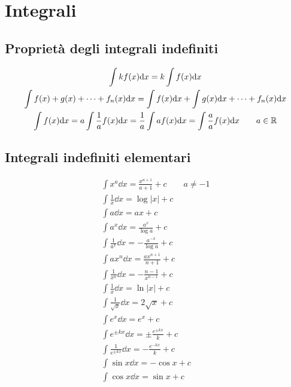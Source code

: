 
\chapter{Integrali} %

\label{ch:integrali} %

\section{Proprietà degli integrali indefiniti}
\begin{gather}
\int kf(x)\mathrm{d} x=k\int f(x)\mathrm{d} x\\
\int f(x)+g(x)+\dots+f_n(x)\mathrm{d} x=\int f(x)\mathrm{d} x+\int g(x)\mathrm{d} x+\dots+f_n(x)\mathrm{d} x \\
\int f(x)\mathrm{d} x=a\int\frac{1}{a}f(x)\mathrm{d} x = \frac{1}{a}\int af(x)\mathrm{d} x = \int\frac{a}{a}f(x)\mathrm{d} x \qquad a\in\mathbb{R}
\end{gather}
\section{Integrali indefiniti elementari}
\begin{gather}
\int x^a \dd x = \frac{x^{a+1}}{a+1}+c \qquad a\neq-1 \\
\int\frac{1}{x}\dd x = \log|x|+c\\
\int a \dd x = ax+c \\
\int a^x \dd x = \frac{a^x}{\log a}+c \\
\int\frac{1}{a^x}\dd x = -\frac{a^{-x}}{\log a}+c \\
\int ax^n \dd x = \frac{ax^{n+1}}{n+1}+c \\
\int \frac{1}{x^n}\dd x = -\frac{n-1}{x^{n-1}}+c\\
\int\frac{1}{x}\dd x=\ln|x|+c \\
\int\frac{1}{\sqrt{x}}\dd x = 2\sqrt{x}+c \\
\int e^x \dd x = e^x+c \\
\int e^{\pm kx}\dd x = \pm\frac{e^{\pm kx}}{k}+c \\
\int \frac{1}{e^{\pm kx}}\dd x = -\frac{e^{-kx}}{k}+c \\
\int\sin x\dd x = -\cos x+c \\
\int\cos x\dd x = \sin x+c
\end{gather}

